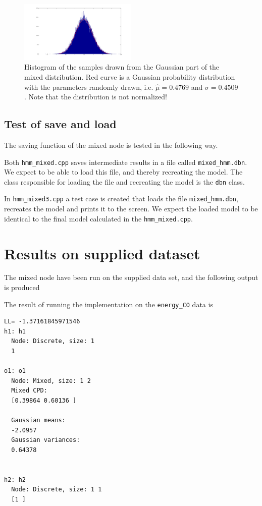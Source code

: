 \documentclass[10pt, journal, compsocconf,a4paper]{IEEEtran}
\begin{document}
\begin{figure}
\centering
\includegraphics[width=0.5\textwidth]{figures/fig1.png}
\caption{Histogram of the samples drawn from the Gaussian part of the mixed distribution. Red curve is a Gaussian probability distribution with the parameters randomly drawn, i.e. $\hat{\mu} = 0.4769$ and $\sigma = 0.4509$. Note that the distribution is not normalized!}
\label{fig1}
\end{figure}




\subsection{Test of save and load} %
\label{sub:test_of_save_and_load}
The saving function of the mixed node is tested in the following way. 

Both \texttt{hmm\_mixed.cpp} saves intermediate results in a file called \texttt{mixed\_hmm.dbn}. We expect to be able to load this file, and thereby recreating the model. The class responsible for loading the file and recreating the model is the \texttt{dbn} class. 

In \texttt{hmm\_mixed3.cpp} a test case is created that loads the file \texttt{mixed\_hmm.dbn}, recreates the model and prints it to the screen. We expect the loaded model to be identical to the final model calculated in the \texttt{hmm\_mixed.cpp}.






\section{Results on supplied dataset} %
\label{sec:results}
The mixed node have been run on the supplied data set, and the following output is produced

The result of running the implementation on the \texttt{energy\_CO} data is
\begin{verbatim}
LL= -1.37161845971546
h1: h1
  Node: Discrete, size: 1 
  1 

o1: o1
  Node: Mixed, size: 1 2 
  Mixed CPD: 
  [0.39864 0.60136 ]

  Gaussian means: 
  -2.0957 
  Gaussian variances: 
  0.64378 


h2: h2
  Node: Discrete, size: 1 1 
  [1 ]  
\end{verbatim}
\end{document}
